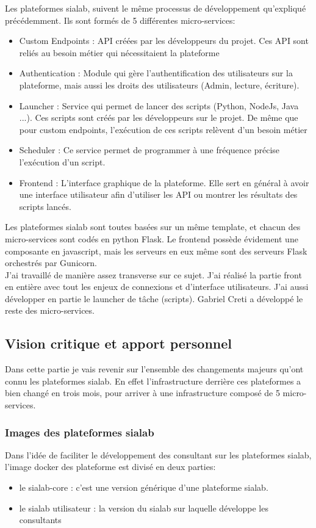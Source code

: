 \documentclass{article} %
\begin{document}
Les plateformes sialab, suivent le même processus de développement qu'expliqué précédemment. Ils sont formés de 5 différentes micro-services:
\begin{itemize}
	\item Custom Endpoints : API créées par les développeurs du projet. Ces API sont reliés au besoin métier qui nécessitaient la plateforme
	\item Authentication : Module qui gère l'authentification des utilisateurs sur la plateforme, mais aussi les droits des utilisateurs (Admin, lecture, écriture).
	\item Launcher : Service qui permet de lancer des scripts (Python, NodeJs, Java ...). Ces scripts sont créés par les développeurs sur le projet. De même que pour custom endpoints, l'exécution de ces scripts relèvent d'un besoin métier
	\item Scheduler : Ce service permet de programmer à une fréquence précise l'exécution d'un script.
	\item Frontend : L'interface graphique de la plateforme. Elle sert en général à avoir une interface utilisateur afin d'utiliser les API ou montrer les résultats des scripts lancés.
\end{itemize}

Les plateformes sialab sont toutes basées sur un même template, et chacun des micro-services sont codés en python Flask. Le frontend possède évidement une composante en javascript, mais les serveurs en eux même sont des serveurs Flask orchestrés par Gunicorn.\\

J'ai travaillé de manière assez transverse sur ce sujet. J'ai réalisé la partie front en entière avec tout les enjeux de connexions et d'interface utilisateurs. J'ai aussi développer en partie le launcher de tâche (scripts). Gabriel Creti a développé le reste des micro-services.

\subsection{Vision critique et apport personnel}
Dans cette partie je vais revenir sur l'ensemble des changements majeurs qu'ont connu les plateformes sialab. En effet l'infrastructure derrière ces plateformes a bien changé en trois mois, pour arriver à une infrastructure composé de 5 micro-services.

\subsubsection{Images des plateformes sialab}
Dans l'idée de faciliter le développement des consultant sur les plateformes sialab, l'image docker des plateforme est divisé en deux parties:
\begin{itemize}
	\item le sialab-core : c'est une version générique d'une plateforme sialab.
	\item le sialab utilisateur : la version du sialab sur laquelle développe les consultants
\end{itemize}
\end{document}
